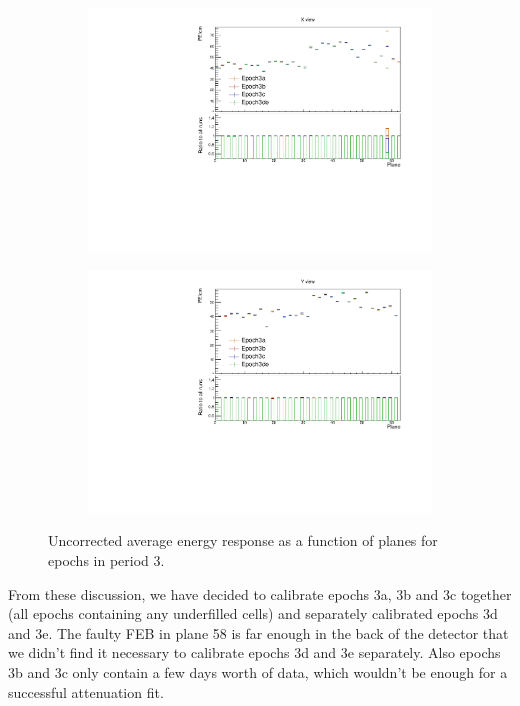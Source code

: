 \documentclass[12pt,a4paper]{article}
\begin{document}
\begin{figure}[!hbtp]
\centering
\begin{subfigure}[b]{0.495\textwidth}
\centering
\includegraphics[width=\textwidth]{Plots/Attenprofs_P3Data_PlanePE_X_Combined.pdf}
\end{subfigure}
\begin{subfigure}[b]{0.495\textwidth}
\centering
\includegraphics[width=\textwidth]{Plots/Attenprofs_P3Data_PlanePE_Y_Combined.pdf}
\end{subfigure}
\caption{Uncorrected average energy response as a function of planes for epochs in period 3.}
\label{figCalibhistPlanePE_period3}
\end{figure}

From these discussion, we have decided to calibrate epochs 3a, 3b and 3c together (all epochs containing any underfilled cells) and separately calibrated epochs 3d and 3e. The faulty FEB in plane 58 is far enough in the back of the detector that we didn't find it necessary to calibrate epochs 3d and 3e separately. Also epochs 3b and 3c only contain a few days worth of data, which wouldn't be enough for a successful attenuation fit.
\end{document}
